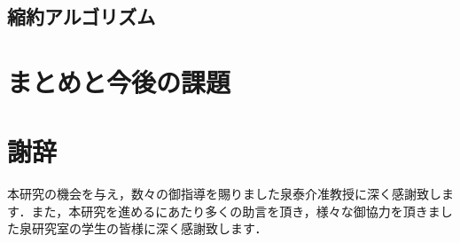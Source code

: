 \documentclass{thesis}
\theoremstyle{definition}
\begin{document}
\section{縮約アルゴリズム}


\chapter{まとめと今後の課題}

\chapter{謝辞}
本研究の機会を与え，数々の御指導を賜りました泉泰介准教授に深く感謝致します．また，本研究を進めるにあたり多くの助言を頂き，様々な御協力を頂きました泉研究室の学生の皆様に深く感謝致します．

\nocite{*}


%
\end{document}
